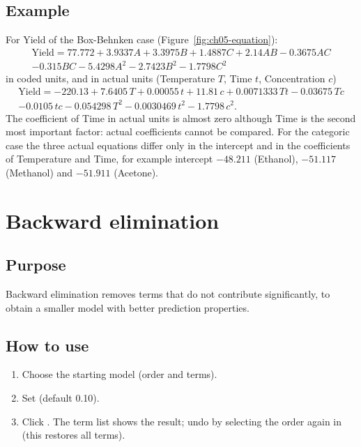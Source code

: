 \subsection*{Example}
For Yield of the Box-Behnken case (Figure~\ref{fig:ch05-equation}):
\begin{multline*}
\text{Yield}=77.772+3.9337A+3.3975B+1.4887C+2.14AB-0.3675AC\\
-0.315BC-5.4298A^2-2.7423B^2-1.7798C^2
\end{multline*}
in coded units, and in actual units (Temperature $T$, Time $t$, Concentration $c$)
\begin{multline*}
\text{Yield}=-220.13+7.6405\,T+0.00055\,t+11.81\,c+0.0071333\,Tt-0.03675\,Tc\\
-0.0105\,tc-0.054298\,T^2-0.0030469\,t^2-1.7798\,c^2.
\end{multline*} The coefficient of Time in actual units is
almost zero although Time is the second most important factor: actual coefficients cannot be compared.
For the categoric case the three actual equations differ only in the intercept and in the coefficients
of Temperature and Time, for example intercept $-48.211$ (Ethanol), $-51.117$ (Methanol) and $-51.911$
(Acetone).

\section{Backward elimination}\label{sec:ch05-backward}

\subsection*{Purpose}
Backward elimination removes terms that do not contribute significantly, to obtain a smaller model with
better prediction properties.

\subsection*{How to use}
\begin{enumerate}
  \item Choose the starting model (order and terms).
  \item Set  (default 0.10).
  \item Click . The term list shows the result; undo by selecting the order again
        in  (this restores all terms).
\end{enumerate}

